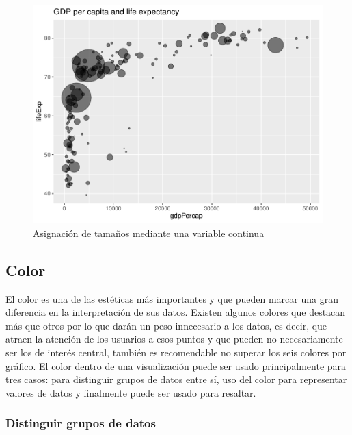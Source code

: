 \documentclass[
]{book}
\begin{document}
\begin{figure}

{\centering \includegraphics[width=0.8\linewidth]{Lineamientos-Visualizar_files/figure-latex/usotamanocontinuo-fig-1} 

}

\caption{Asignación de tamaños mediante una variable continua}\label{fig:usotamanocontinuo-fig}
\end{figure}

\hypertarget{colores}{%
\subsection{Color}\label{colores}}

El color es una de las estéticas más importantes y que pueden marcar una gran diferencia en la interpretación de sus datos. Existen algunos colores que destacan más que otros por lo que darán un peso innecesario a los datos, es decir, que atraen la atención de los usuarios a esos puntos y que pueden no necesariamente ser los de interés central, también es recomendable no superar los seis colores por gráfico. El color dentro de una visualización puede ser usado principalmente para tres casos: para distinguir grupos de datos entre sí, uso del color para representar valores de datos y finalmente puede ser usado para resaltar.

\hypertarget{distinguir-grupos-de-datos}{%
\subsubsection{Distinguir grupos de datos}\label{distinguir-grupos-de-datos}}
\end{document}
